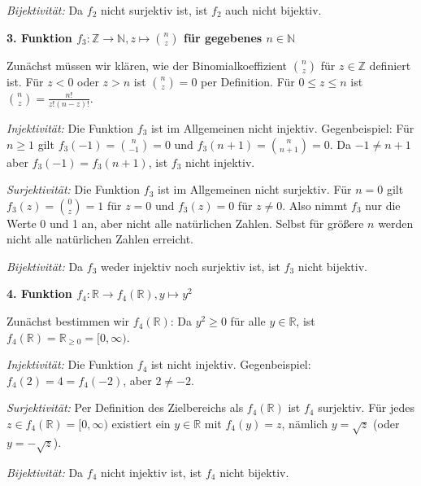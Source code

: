 \documentclass{article}
\begin{document}
\textit{Bijektivität:} Da $f_2$ nicht surjektiv ist, ist $f_2$ auch nicht bijektiv.

\textbf{3. Funktion $f_3: \mathbb{Z} \to \mathbb{N}, z \mapsto \binom{n}{z}$ für gegebenes $n \in \mathbb{N}$}

Zunächst müssen wir klären, wie der Binomialkoeffizient $\binom{n}{z}$ für $z \in \mathbb{Z}$ definiert ist.
Für $z < 0$ oder $z > n$ ist $\binom{n}{z} = 0$ per Definition.
Für $0 \leq z \leq n$ ist $\binom{n}{z} = \frac{n!}{z!(n-z)!}$.

\textit{Injektivität:} Die Funktion $f_3$ ist im Allgemeinen nicht injektiv.
Gegenbeispiel: Für $n \geq 1$ gilt $f_3(-1) = \binom{n}{-1} = 0$ und $f_3(n+1) = \binom{n}{n+1} = 0$.
Da $-1 \neq n+1$ aber $f_3(-1) = f_3(n+1)$, ist $f_3$ nicht injektiv.

\textit{Surjektivität:} Die Funktion $f_3$ ist im Allgemeinen nicht surjektiv.
Für $n = 0$ gilt $f_3(z) = \binom{0}{z} = 1$ für $z = 0$ und $f_3(z) = 0$ für $z \neq 0$.
Also nimmt $f_3$ nur die Werte 0 und 1 an, aber nicht alle natürlichen Zahlen.
Selbst für größere $n$ werden nicht alle natürlichen Zahlen erreicht.

\textit{Bijektivität:} Da $f_3$ weder injektiv noch surjektiv ist, ist $f_3$ nicht bijektiv.

\textbf{4. Funktion $f_4: \mathbb{R} \to f_4(\mathbb{R}), y \mapsto y^2$}

Zunächst bestimmen wir $f_4(\mathbb{R})$: Da $y^2 \geq 0$ für alle $y \in \mathbb{R}$, ist $f_4(\mathbb{R}) = \mathbb{R}_{\geq 0} = [0, \infty)$.

\textit{Injektivität:} Die Funktion $f_4$ ist nicht injektiv.
Gegenbeispiel: $f_4(2) = 4 = f_4(-2)$, aber $2 \neq -2$.

\textit{Surjektivität:} Per Definition des Zielbereichs als $f_4(\mathbb{R})$ ist $f_4$ surjektiv.
Für jedes $z \in f_4(\mathbb{R}) = [0, \infty)$ existiert ein $y \in \mathbb{R}$ mit $f_4(y) = z$, 
nämlich $y = \sqrt{z}$ (oder $y = -\sqrt{z}$).

\textit{Bijektivität:} Da $f_4$ nicht injektiv ist, ist $f_4$ nicht bijektiv.
\end{document}
